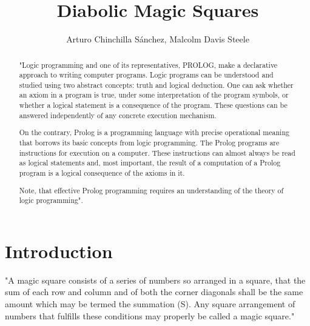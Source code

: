 \documentclass[12pt]{article}
\title{Diabolic Magic Squares}
\author{Arturo Chinchilla Sánchez, Malcolm Davis Steele}
\begin{document}
\maketitle
\begin{abstract}
"Logic programming and one of its representatives, PROLOG, make a declarative approach to writing computer programs. Logic programs can be understood and studied using two abstract concepts: truth and logical deduction. One can ask whether an axiom in a program is true, under some interpretation of the program symbols, or whether a logical statement is a consequence of the program. These questions can be answered independently of any concrete execution mechanism.

On the contrary, Prolog is a programming language with precise operational meaning that borrows its basic concepts from logic programming. The Prolog programs are instructions for execution on a computer. These instructions can almost always be read as logical statements and, most important, the result of a computation of a Prolog program is a logical consequence of the axioms in it.

Note, that effective Prolog programming requires an understanding of the theory of logic programming".\cite{abstract}
\end{abstract}


\newpage
\tableofcontents %
\listoffigures %

\newpage
\section{Introduction}

 "A magic square consists of a series of numbers so arranged in a square, that the sum of each row and column and of both the corner diagonals shall be the same amount which may be termed the summation (S). Any square arrangement of numbers that fulfills these conditions may properly be called a magic square." \cite{Andrews}
 
\end{document}
